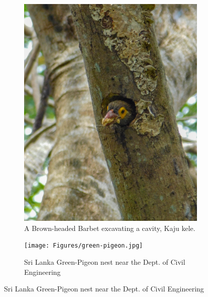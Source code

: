 \begin{figure}[!htpb]
    \centering
    \begin{subfigure}{0.45\textwidth}
        \includegraphics[width=\textwidth]{Figures/brown-headed-barbet.jpg}
        \caption{A Brown-headed Barbet excavating a cavity, Kaju kele.}
        \label{fig:figure-02.1}
    \end{subfigure}
    \hspace{.5cm} %
    \begin{subfigure}{0.45\textwidth}
        \texttt{[image: Figures/green-pigeon.jpg]}
        \caption{Sri Lanka Green-Pigeon nest near the Dept. of Civil Engineering}
        \label{fig:figure-02.2}
    \end{subfigure}


\end{figure}
